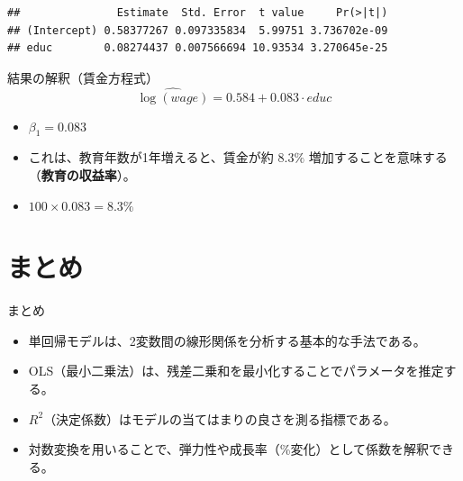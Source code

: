 \documentclass[
  ignorenonframetext,
]{beamer}
\newenvironment{Shaded}{\begin{snugshade}}{\end{snugshade}}
\newcommand{\FunctionTok}[1]{\textcolor[rgb]{0.00,0.00,0.00}{#1}}
\newcommand{\NormalTok}[1]{#1}
\newcommand{\SpecialCharTok}[1]{\textcolor[rgb]{0.00,0.00,0.00}{#1}}
\providecommand{\tightlist}{%
  \setlength{\itemsep}{0pt}\setlength{\parskip}{0pt}}
\begin{document}
\begin{frame}[fragile]{}
\protect\hypertarget{section-1}{}
\scriptsize

\begin{Shaded}
\end{Shaded}

\begin{verbatim}
##               Estimate  Std. Error  t value     Pr(>|t|)
## (Intercept) 0.58377267 0.097335834  5.99751 3.736702e-09
## educ        0.08274437 0.007566694 10.93534 3.270645e-25
\end{verbatim}
\end{frame}

\begin{frame}{結果の解釈（賃金方程式）}
\protect\hypertarget{ux7d50ux679cux306eux89e3ux91c8ux8cc3ux91d1ux65b9ux7a0bux5f0f}{}
\[ \widehat{\log(wage)} = 0.584 + 0.083 \cdot educ \]

\begin{itemize}
\tightlist
\item
  \(\beta_1 = 0.083\)
\item
  これは、教育年数が1年増えると、賃金が約 \(8.3\%\)
  増加することを意味する（\textbf{教育の収益率}）。
\item
  \(100 \times 0.083 = 8.3\%\)
\end{itemize}
\end{frame}

\hypertarget{ux307eux3068ux3081}{%
\section{まとめ}\label{ux307eux3068ux3081}}

\begin{frame}{まとめ}
\protect\hypertarget{ux307eux3068ux3081-1}{}
\begin{itemize}
\tightlist
\item
  単回帰モデルは、2変数間の線形関係を分析する基本的な手法である。
\item
  OLS（最小二乗法）は、残差二乗和を最小化することでパラメータを推定する。
\item
  \(R^2\)（決定係数）はモデルの当てはまりの良さを測る指標である。
\item
  対数変換を用いることで、弾力性や成長率（\%変化）として係数を解釈できる。
\end{itemize}
\end{frame}
\end{document}
